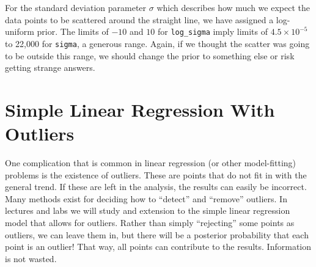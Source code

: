 For the standard deviation parameter $\sigma$ which describes how much we
expect the data points to be scattered around the straight line, we have assigned
a log-uniform prior. The limits of $-10$ and $10$ for {\tt log\_sigma} imply
limits of $4.5 \times 10^{-5}$ to 22,000 for {\tt sigma}, a generous range.
Again, if we thought the scatter
was going to be outside this range, we should change the prior to something
else or risk getting strange answers.



\chapter{Simple Linear Regression With Outliers}
One complication that is common in linear regression (or other model-fitting)
problems is the existence of outliers. These are points that do not fit in with
the general trend. If these are left in the analysis, the results can easily
be incorrect. Many methods exist for deciding how to ``detect'' and ``remove''
outliers. In lectures and labs we will study and extension to the simple linear
regression model that allows for outliers. Rather than simply ``rejecting'' some
points as outliers, we can leave them in, but there will be a posterior probability
that each point is an outlier! That way, all points can contribute to the results.
Information is not wasted.



